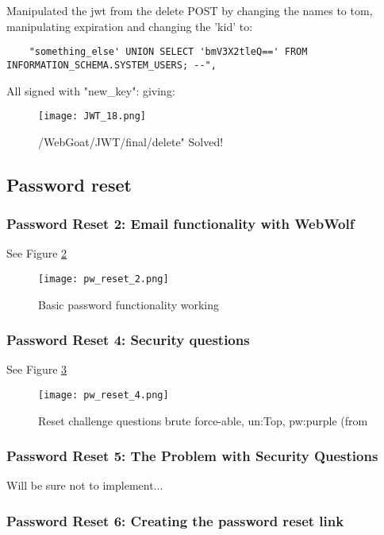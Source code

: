 \documentclass[
	letterpaper, %
	10pt, %
	unnumberedsections, %
	twoside, %
]{APAAssignment}
\begin{document}
\begin{appendices}
Manipulated the jwt from the delete POST by changing the names to tom, manipulating expiration and changing the 'kid' to: 
\begin{verbatim}
	"something_else' UNION SELECT 'bmV3X2tleQ==' FROM INFORMATION_SCHEMA.SYSTEM_USERS; --", 
\end{verbatim}

All signed with "new\_key": giving:

\begin{figure}[!ht] %
	\centering
	\texttt{[image: JWT\_18.png]}
	\caption{/WebGoat/JWT/final/delete" Solved!}
	\label{fig:app:JWT18}
\end{figure}

\subsection{Password reset}\label{app:pwReset}

\subsubsection{Password Reset 2: Email functionality with WebWolf}
See Figure \ref{fig:app:pw_reset_2}

\begin{figure}[!htp] %
	\centering
	\texttt{[image: pw\_reset\_2.png]}
	\caption{Basic password functionality working}
	\label{fig:app:pw_reset_2}
\end{figure}

\subsubsection{Password Reset 4: Security questions}
See Figure \ref{fig:app:pw_reset_4}

\begin{figure}[!htp] %
	\centering
	\texttt{[image: pw\_reset\_4.png]}
	\caption{Reset challenge questions brute force-able, un:Top, pw:purple (from \cite{CycubicsDocsWebGoat}}
	\label{fig:app:pw_reset_4}
\end{figure}

\subsubsection{Password Reset 5: The Problem with Security Questions}
Will be sure not to implement...


\subsubsection{Password Reset 6: Creating the password reset link}\label{app:pwReset6}


\end{appendices}
\end{document}
